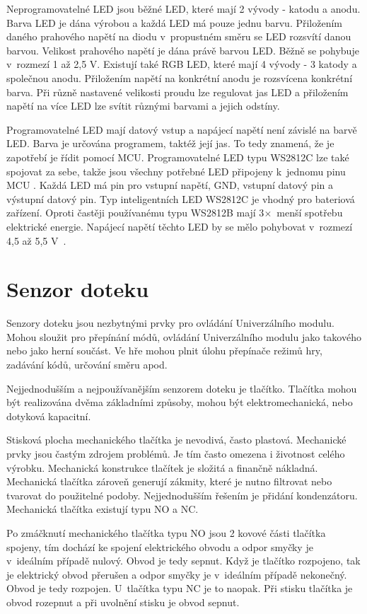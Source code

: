 Neprogramovatelné LED jsou běžné LED, které mají 2 vývody - katodu a anodu. Barva LED je dána výrobou a každá LED má pouze jednu 
barvu. Přiložením daného prahového napětí na diodu v~propustném směru se LED rozsvítí danou barvou. Velikost prahového napětí je dána
právě barvou LED. Běžně se pohybuje v~rozmezí 1 až 2,5 V. Existují také RGB LED, které mají 4 vývody - 3 katody a společnou anodu. 
Přiložením napětí na konkrétní anodu je rozsvícena konkrétní barva. Při různě nastavené velikosti proudu lze regulovat jas LED 
a přiložením napětí na více LED lze svítit různými barvami a jejich odstíny. 

Programovatelné LED mají datový vstup a napájecí napětí není závislé na barvě LED. 
Barva je určována programem, taktéž její jas. To tedy znamená, že je zapotřebí je řídit 
pomocí MCU. Programovatelné LED typu WS2812C lze také spojovat za sebe, takže jsou všechny potřebné LED připojeny k~jednomu pinu 
MCU \cite{WS2812C_dtsh}. Každá LED má pin pro vstupní napětí, GND, vstupní datový pin a výstupní datový pin. Typ inteligentních LED 
WS2812C je vhodný pro bateriová zařízení. Oproti častěji používanému typu WS2812B mají 3$\times$~menší spotřebu elektrické energie. 
Napájecí napětí těchto LED by se mělo pohybovat v~rozmezí 4,5 až 5,5 V~\cite{WS2812C_dtsh}. 

\section{Senzor doteku}
Senzory doteku jsou nezbytnými prvky pro ovládání Univerzálního modulu. Mohou sloužit pro přepínání módů, ovládání Univerzálního modulu
 jako takového nebo jako herní součást. Ve hře mohou plnit úlohu přepínače režimů hry, zadávání kódů, určování směru apod. 

Nejjednodušším a nejpoužívanějším senzorem doteku je tlačítko. 
Tlačítka mohou být realizována dvěma základními způsoby, mohou být elektromechanická, nebo dotyková kapacitní. 

Stisková plocha mechanického tlačítka je nevodivá, často plastová. Mechanické prvky jsou častým zdrojem problémů. Je tím často omezena i 
životnost celého výrobku. Mechanická konstrukce tlačítek je složitá a finančně nákladná. Mechanická tlačítka zároveň generují zákmity, které 
je nutno filtrovat nebo tvarovat do použitelné podoby. Nejjednodušším řešením je přidání kondenzátoru. Mechanická tlačítka existují typu NO 
a NC. 

Po zmáčknutí mechanického tlačítka typu NO jsou 2 kovové části tlačítka spojeny, tím dochází ke spojení elektrického obvodu 
a odpor smyčky je v~ideálním případě nulový. Obvod je tedy sepnut. Když je tlačítko rozpojeno, tak je 
elektrický obvod přerušen a odpor smyčky je v~ideálním případě nekonečný. Obvod je tedy rozpojen. U~tlačítka typu NC je to naopak. Při stisku 
tlačítka je obvod rozepnut a při uvolnění stisku je obvod sepnut. 

